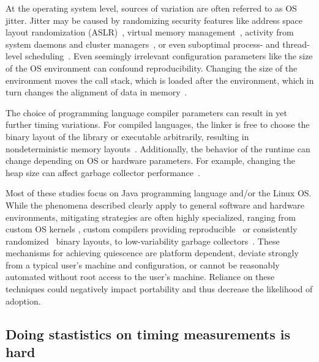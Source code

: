 \documentclass[conference]{IEEEtran}
\begin{document}
At the operating system level, sources of variation are often referred to as
OS jitter.
Jitter may be caused by randomizing security features like address space layout
randomization (ASLR)~\cite{Shacham2004},
virtual memory management~\cite{Oyama2014,Oyama2016},
activity from system daemons and cluster managers~\cite{Petrini2003},
or even suboptimal process- and thread-level scheduling~\cite{Lozi2016}.
Even seemingly irrelevant configuration parameters like the size of the
OS environment can confound reproducibility. Changing the size of the
environment moves the call stack, which is loaded after the environment, which
in turn changes the alignment of data in memory~\cite{Mytkowicz2009}.

The choice of programming language compiler parameters can result in yet
further timing variations.
For compiled languages, the linker is free to choose the binary layout of the
library or executable arbitrarily, resulting in nondeterministic memory
layouts~\cite{Georges2008}.
Additionally, the behavior of the runtime can change depending on OS or hardware
parameters. For example, changing the heap size can affect garbage collector
performance~\cite{Blackburn2004}.

Most of these studies focus on Java programming language and/or the Linux OS.
While the phenomena described clearly apply to general software and hardware environments,
mitigating strategies are often highly specialized, ranging from custom OS
kernels \cite{Tessellation,Akkan2012}, custom compilers providing
reproducible~\cite{Georges2008} or consistently randomized~\cite{Curtsinger2013}
binary layouts, to low-variability garbage collectors~\cite{Huang2004}.
These mechanisms for achieving quiescence are platform dependent, deviate strongly
from a typical user's machine and configuration, or cannot be reasonably automated without
root access to the user's machine. Reliance on these techniques could negatively impact
portability and thus decrease the likelihood of adoption.



\subsection{Doing stastistics on timing measurements is hard}
\end{document}
